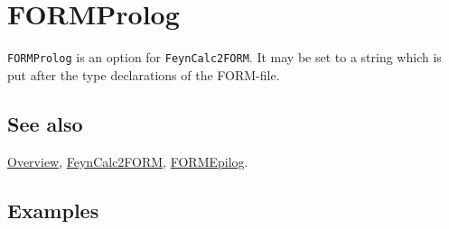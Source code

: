 \documentclass[../FeynCalcManual.tex]{subfiles}
\begin{document}
\hypertarget{formprolog}{
\section{FORMProlog}\label{formprolog}}

\texttt{FORMProlog} is an option for \texttt{FeynCalc2FORM}. It may be
set to a string which is put after the type declarations of the
FORM-file.

\subsection{See also}

\hyperlink{toc}{Overview}, \hyperlink{feyncalc2form}{FeynCalc2FORM},
\hyperlink{formepilog}{FORMEpilog}.

\subsection{Examples}
\end{document}
